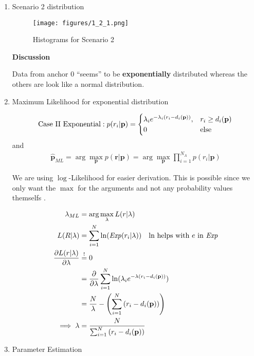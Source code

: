 \documentclass[12pt,a4paper]{article}
\begin{document}
\begin{enumerate}[1.]
  \item Scenario 2 distribution
  
\begin{figure}[H]
  \centering
  \texttt{[image: figures/1\_2\_1.png]}
	\caption{Histograms for Scenario 2}
	\label{1_2_1}
\end{figure}
  
\textbf{Discussion}

Data from anchor $0$ ``seems'' to be \textbf{exponentially} distributed whereas
the others are look like a normal distribution.
  
  \item Maximum Likelihood for exponential distribution
  
\begin{align*}
\textnormal{Case II Exponential}: p(r_i|\mathbf{p}) = 
\begin{cases}
\lambda_i e^{-\lambda_i(r_i-d_i(\mathbf{p}))}, & r_i \geq d_i(\mathbf{p})\\
0 & \text{else}
\end{cases}
\end{align*}
and
\begin{align*}
\mathbf{\hat{p}}_{ML}=\arg\max_{\textbf{p}} p(\textbf{r}|\textbf{p}) = 
\arg\max_{\textbf{p}}\prod_{i=1}^{N_A}p(r_i|\textbf{p})
\end{align*}

We are using $\log$-Likelihood for easier derivation. This is possible since we
only want the $\max$ for the arguments and not any probability values
themselfs \autocite[9]{lecuter_notes_spsc}.

\begin{align*}
\lambda_{ML}&=\arg\max_{\lambda}L(r|\lambda)\\
L(R|\lambda)&=\sum_{i=1}^N \ln(\mathit{Exp}(r_i|\lambda))\quad\textnormal{ln
helps with }e\textnormal{ in } \mathit{Exp}\\
\frac{\partial L(r|\lambda)}{\partial\lambda} &\stackrel{!}{=} 0\\
&=\frac{\partial}{\partial\lambda}\sum_{i=1}^N \ln(\lambda_i
e^{-\lambda(r_i-d_i(\mathbf{p}))})\\
&=\frac{N}{\lambda}-\left(\sum_{i=1}^N\left(r_i-d_i(\mathbf{p})\right)\right)\\
\implies \lambda &= \frac{N}{\sum_{i=1}^N\left(r_i-d_i(\mathbf{p})\right)} 
\end{align*}


  \item Parameter Estimation


\end{enumerate}
\end{document}
